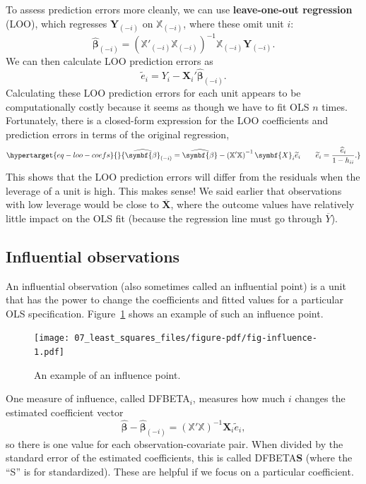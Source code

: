 \documentclass[
  letterpaper,
  DIV=11,
  numbers=noendperiod]{scrreprt}
\newcommand{\mb}{\symbf}
\newcommand{\X}{\mb{X}}
\newcommand{\Xmat}{\mathbb{X}}
\newcommand{\bhat}{\widehat{\mb{\beta}}}
\theoremstyle{plain}
\theoremstyle{definition}
\theoremstyle{definition}
\theoremstyle{remark}
\begin{document}
To assess prediction errors more cleanly, we can use
\textbf{leave-one-out regression} (LOO), which regresses
\(\mb{Y}_{(-i)}\) on \(\Xmat_{(-i)}\), where these omit unit \(i\): \[ 
\bhat_{(-i)} = \left(\Xmat'_{(-i)}\Xmat_{(-i)}\right)^{-1}\Xmat_{(-i)}\mb{Y}_{(-i)}.
\] We can then calculate LOO prediction errors as \[ 
\widetilde{e}_{i} = Y_{i} - \X_{i}'\bhat_{(-i)}.
\] Calculating these LOO prediction errors for each unit appears to be
computationally costly because it seems as though we have to fit OLS
\(n\) times. Fortunately, there is a closed-form expression for the LOO
coefficients and prediction errors in terms of the original regression,
\begin{equation}\protect\hypertarget{eq-loo-coefs}{}{ 
\bhat_{(-i)} = \bhat - \left( \Xmat'\Xmat\right)^{-1}\X_i\widetilde{e}_i \qquad \widetilde{e}_i = \frac{\widehat{e}_i}{1 - h_{ii}}.
}\label{eq-loo-coefs}\end{equation} This shows that the LOO prediction
errors will differ from the residuals when the leverage of a unit is
high. This makes sense! We said earlier that observations with low
leverage would be close to \(\overline{\X}\), where the outcome values
have relatively little impact on the OLS fit (because the regression
line must go through \(\overline{Y}\)).

\hypertarget{influential-observations}{%
\subsection{Influential observations}\label{influential-observations}}

An influential observation (also sometimes called an influential point)
is a unit that has the power to change the coefficients and fitted
values for a particular OLS specification. Figure~\ref{fig-influence}
shows an example of such an influence point.

\begin{figure}[th]

{\centering \texttt{[image: 07\_least\_squares\_files/figure-pdf/fig-influence-1.pdf]}

}

\caption{\label{fig-influence}An example of an influence point.}

\end{figure}

One measure of influence, called DFBETA\(_i\), measures how much \(i\)
changes the estimated coefficient vector \[ 
\bhat - \bhat_{(-i)} = \left( \Xmat'\Xmat\right)^{-1}\X_i\widetilde{e}_i,
\] so there is one value for each observation-covariate pair. When
divided by the standard error of the estimated coefficients, this is
called DFBETA\textbf{S} (where the ``S'' is for standardized). These are
helpful if we focus on a particular coefficient.
\end{document}
